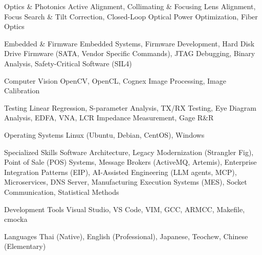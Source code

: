 \begin{cvskills}
  \cvskill
    {Optics \& Photonics} %
    {Active Alignment, Collimating \& Focusing Lens Alignment, Focus Search \& Tilt Correction, Closed-Loop Optical Power Optimization, Fiber Optics} %

  \cvskill
    {Embedded \& Firmware} %
    {Embedded Systems, Firmware Development, Hard Disk Drive Firmware (SATA, Vendor Specific Commands), JTAG Debugging, Binary Analysis, Safety-Critical Software (SIL4)} %

  \cvskill
    {Computer Vision} %
      {OpenCV, OpenCL, Cognex Image Processing, Image Calibration} %

  \cvskill
    {Testing} %
      {Linear Regression, S-parameter Analysis, TX/RX Testing, Eye Diagram Analysis, EDFA, VNA, LCR Impedance Measurement, Gage R\&R} %

  \cvskill
    {Operating Systems} %
    {Linux (Ubuntu, Debian, CentOS), Windows} %

  \cvskill
    {Specialized Skills} %
    {Software Architecture, Legacy Modernization (Strangler Fig), Point of Sale (POS) Systems, Message Brokers (ActiveMQ, Artemis), Enterprise Integration Patterns (EIP), AI-Assisted Engineering (LLM agents, MCP), Microservices, DNS Server, Manufacturing Execution Systems (MES), Socket Communication, Statistical Methods} %

  \cvskill
    {Development Tools} %
    {Visual Studio, VS Code, VIM, GCC, ARMCC, Makefile, cmocka} %

  \cvskill
    {Languages} %
    {Thai (Native), English (Professional), Japanese, Teochew, Chinese (Elementary)} %

\end{cvskills}
